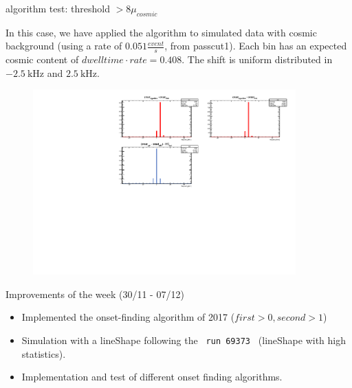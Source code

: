 \documentclass[8pt]{beamer}
\begin{document}
\begin{frame}{algorithm test: threshold $ > 8 \mu_{cosmic}$}

In this case, we have applied the algorithm to simulated data with cosmic background (using a rate of $0.051 \frac{event}{s}$, from passcut1). Each bin has an expected cosmic content of $dwelltime \cdot rate = 0.408$.
The shift is uniform distributed in $\SI{-2.5}{\kilo \hertz}$ and $\SI{+2.5}{\kilo \hertz}$. 
\begin{figure}
\includegraphics[width = 0.9\textwidth]{../Plot/OnsetResult15.pdf}
\end{figure}

\end{frame}

\begin{frame}{ Improvements of the week (30/11 - 07/12)}
\begin{itemize}
\item Implemented the onset-finding algorithm of 2017 ($first > 0 , second > 1$)
\item Simulation with a lineShape following the \texttt{ run 69373 } (lineShape with high statistics).
\item Implementation and test of different onset finding algorithms.
\end{itemize}
\end{frame}
\end{document}
